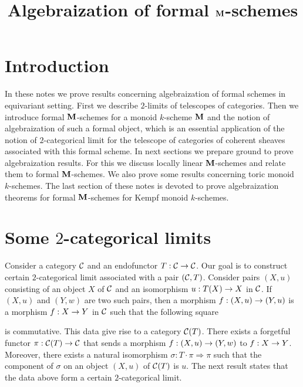 

\usepackage{todonotes}
\newcommand{\lstodo}[1]{\todo[color=green!40,bordercolor=green,size=\footnotesize]{\textbf{LS TODO: }#1}}



\title{Algebraization of formal $\mathbf{M}$-schemes}
\date{}
\maketitle

\section{Introduction}
\noindent
In these notes we prove results concerning algebraization of formal schemes in equivariant setting. First we describe $2$-limits of telescopes of categories. Then we introduce formal $\mathbf{M}$-schemes for a monoid $k$-scheme $\mathbf{M}$ and the notion of algebraization of such a formal object, which is an essential application of the notion of $2$-categorical limit for the telescope of categories of coherent sheaves associated with this formal scheme. In next sections we prepare ground to prove algebraization results. For this we discuss locally linear $\mathbf{M}$-schemes and relate them to formal $\mathbf{M}$-schemes. We also prove some results concerning toric monoid $k$-schemes. The last section of these notes is devoted to prove algebraization theorems for formal $\mathbf{M}$-schemes for Kempf monoid $k$-schemes. 

\section{Some $2$-categorical limits}
\noindent
Consider a category ${\mathcal C}$ and an endofunctor $T:{\mathcal C}\rightarrow {\mathcal C}$. Our goal is to construct certain $2$-categorical limit associated with a pair $({\mathcal C},T)$. Consider pairs $\left(X,u\right)$ consisting of an object $X$ of ${\mathcal C}$ and an isomorphism $u:T(X)\rightarrow X$ in ${\mathcal C}$. If $\left(X,u\right)$ and $\left(Y,w\right)$ are two such pairs, then a morphism $f:(X,u) \rightarrow (Y,u)$ is a morphism $f:X\rightarrow Y$ in ${\mathcal C}$ such that the following square
\begin{center}
\end{center}
is commutative. This data give rise to a category ${\mathcal C}(T)$. There exists a forgetful functor $\pi:{\mathcal C}(T)\rightarrow {\mathcal C}$ that sends a morphism $f:(X,u)\rightarrow (Y,w)$ to $f:X\rightarrow Y$. Moreover, there exists a natural isomorphism $\sigma:T\cdot \pi \Rightarrow \pi$ such that the component of $\sigma$ on an object $(X,u)$ of ${\mathcal C}(T)$ is $u$. The next result states that the data above form a certain $2$-categorical limit.

